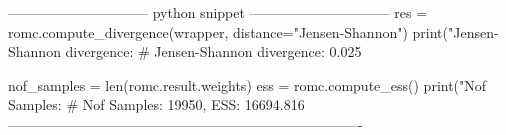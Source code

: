 \begin{Code}
------------------------------ python snippet ------------------------------  
  res = romc.compute_divergence(wrapper, distance="Jensen-Shannon")                                 
  print("Jensen-Shannon divergence: %
  # Jensen-Shannon divergence: 0.025

  nof_samples = len(romc.result.weights)
  ess = romc.compute_ess()
  print("Nof Samples: %
  # Nof Samples: 19950, ESS: 16694.816
----------------------------------------------------------------------------  
\end{Code}
